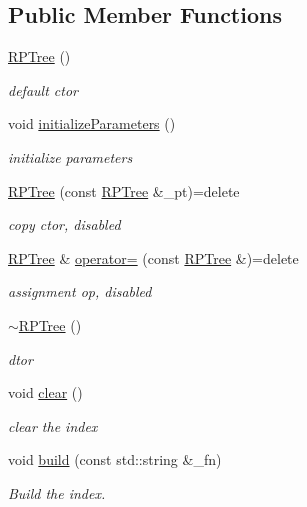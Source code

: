 \subsection*{Public Member Functions}
\begin{DoxyCompactItemize}
\item 
\hyperlink{classRPTree_a8f2ff767c5240574cc0fa3ac462d96eb}{R\-P\-Tree} ()
\begin{DoxyCompactList}\small\item\em default ctor \end{DoxyCompactList}\item 
void \hyperlink{classRPTree_a5e6c4e2609f9fc2f68b3441d40a276aa}{initialize\-Parameters} ()
\begin{DoxyCompactList}\small\item\em initialize parameters \end{DoxyCompactList}\item 
\hyperlink{classRPTree_ab2f2d4464ac417d8e7e8e0ea20863bb7}{R\-P\-Tree} (const \hyperlink{classRPTree}{R\-P\-Tree} \&\-\_\-pt)=delete
\begin{DoxyCompactList}\small\item\em copy ctor, disabled \end{DoxyCompactList}\item 
\hyperlink{classRPTree}{R\-P\-Tree} \& \hyperlink{classRPTree_a708e458235083012d1b96f09dde38c17}{operator=} (const \hyperlink{classRPTree}{R\-P\-Tree} \&)=delete
\begin{DoxyCompactList}\small\item\em assignment op, disabled \end{DoxyCompactList}\item 
\hyperlink{classRPTree_af389bd8657585e51ba03de8f6d0fec21}{$\sim$\-R\-P\-Tree} ()
\begin{DoxyCompactList}\small\item\em dtor \end{DoxyCompactList}\item 
void \hyperlink{classRPTree_a0b3d62f1f4d72585c6ff2c12de1ea09d}{clear} ()
\begin{DoxyCompactList}\small\item\em clear the index \end{DoxyCompactList}\item 
void \hyperlink{classRPTree_ae3d11a4f8de4ffa83c80c31385c7b13f}{build} (const std\-::string \&\-\_\-fn)
\begin{DoxyCompactList}\small\item\em Build the index. \end{DoxyCompactList}\item 

\end{DoxyCompactItemize}
